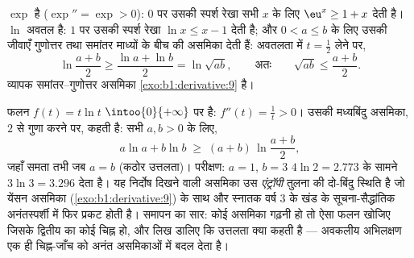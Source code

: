 \begin{example}\label{ex:b1:derivative:convexineq}
$\exp$  है ($\exp'' = \exp > 0$): $0$ पर उसकी स्पर्श रेखा सभी $x$ के
लिए $\eu^x \geq 1 + x$ देती है। $\ln$ अवतल है: $1$ पर उसकी स्पर्श रेखा $\ln
x \leq x - 1$ देती है; और $0 < a \leq b$ के लिए उसकी जीवाएँ गुणोत्तर तथा
समांतर माध्यों के बीच की असमिका देती हैं: अवतलता में $t = \frac12$ लेने पर,
\[
\ln\frac{a + b}{2} \geq \frac{\ln a + \ln b}{2} = \ln\sqrt{ab},
\qquad\text{अतः}\qquad
\sqrt{ab} \leq \frac{a+b}{2} .
\]
व्यापक समांतर--गुणोत्तर असमिका \cref{exo:b1:derivative:9} है।
\end{example}

\begin{example}\label{ex:b1:derivative:xlnx}
फलन $f(t) = t\ln t$ $\intoo{0}{+\infty}$ पर  है: $f''(t) = \frac1t >
0$। उसकी मध्यबिंदु असमिका, $2$ से गुणा करने पर, कहती है: सभी $a, b > 0$ के
लिए,
\[
a\ln a + b\ln b \;\geq\; (a + b)\,\ln\frac{a + b}{2} ,
\]
जहाँ समता तभी जब $a = b$ (कठोर उत्तलता)। परीक्षण: $a = 1$, $b = 3$ $4\ln 2 =
2.773$ के सामने $3\ln 3 = 3.296$ देता है। यह निर्दोष दिखने वाली असमिका उस
\emph{एंट्रॉपी} तुलना की दो-बिंदु स्थिति है जो येंसन असमिका
(\cref{exo:b1:derivative:9}) के साथ और स्नातक वर्ष 3 के खंड के
सूचना-सैद्धांतिक अनंतस्पर्शी में फिर प्रकट होती है। समापन का सार: कोई असमिका
गढ़नी हो तो ऐसा फलन खोजिए जिसके द्वितीय  का कोई चिह्न हो, और लिख डालिए
कि उत्तलता क्या कहती है --- अवकलीय अभिलक्षण एक ही चिह्न-जाँच को अनंत
असमिकाओं में बदल देता है।
\end{example}

